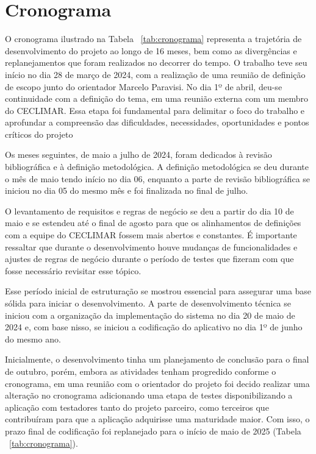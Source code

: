 \chapter{Cronograma}\label{cronograma}

O cronograma ilustrado na Tabela ~\ref{tab:cronograma} representa a trajetória de 
desenvolvimento do projeto ao longo de 16 meses, bem como as divergências e 
replanejamentos que foram realizados no decorrer do tempo. O trabalho teve seu 
início no dia 28 de março de 2024, com a realização de uma reunião de definição 
de escopo junto do orientador Marcelo Paravisi. No dia 1º de abril, deu-se 
continuidade com a definição do tema, em uma reunião externa com um membro do 
CECLIMAR. Essa etapa foi fundamental para delimitar o foco do trabalho e aprofundar 
a compreensão das dificuldades, necessidades, oportunidades e pontos críticos do projeto

Os meses seguintes, de maio a julho de 2024, foram dedicados à revisão bibliográfica 
e à definição metodológica. A definição metodológica se deu durante o mês de maio 
tendo início no dia 06, enquanto a parte de revisão bibliográfica se iniciou no 
dia 05 do mesmo mês e foi finalizada no final de julho. 

O levantamento de requisitos e regras de negócio se deu a partir do dia 10 de 
maio e se estendeu até o final de agosto para que os alinhamentos de definições 
com a equipe do CECLIMAR fossem mais abertos e constantes. É importante ressaltar 
que durante o desenvolvimento houve mudanças de funcionalidades e ajustes de regras 
de negócio durante o período de testes que fizeram com que fosse necessário 
revisitar esse tópico. 

Esse período inicial de estruturação se mostrou essencial para assegurar uma base 
sólida para iniciar o desenvolvimento. A parte de desenvolvimento técnica se 
iniciou com a organização da implementação do sistema no dia 20 de maio de 2024 
e, com base nisso, se iniciou a codificação do aplicativo no dia 1º de junho do mesmo ano. 

Inicialmente, o desenvolvimento tinha um planejamento de conclusão para o final 
de outubro, porém, embora as atividades tenham progredido conforme o cronograma, 
em uma reunião com o orientador do projeto foi decido realizar uma alteração no 
cronograma adicionando uma etapa de testes disponibilizando a aplicação com 
testadores tanto do projeto parceiro, como terceiros que contribuíram para que 
a aplicação adquirisse uma maturidade maior. Com isso, o prazo final de codificação 
foi replanejado para o início de maio de 2025 (Tabela ~\ref{tab:cronograma}).

